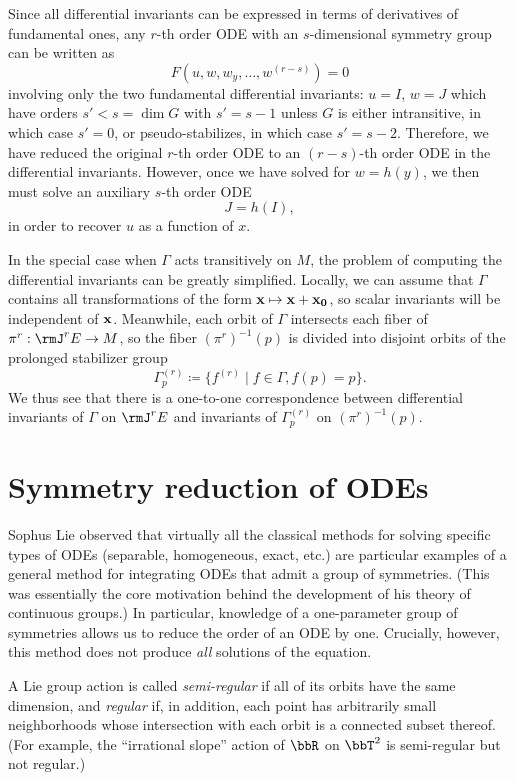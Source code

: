 Since all differential invariants can be expressed in terms of derivatives of fundamental ones, any $r$-th order ODE with an $s$-dimensional symmetry group can be written as 
\[F(u,w,w_y,\ldots,w^{(r-s)})=0\]
involving only the two fundamental differential invariants: $u=I$, $w=J$ which have orders $s'<s=\dim G$  with $s'=s-1$ unless $G$ is either intransitive, in which case $s'=0$, or pseudo-stabilizes, in which case $s'=s-2$. Therefore, we have reduced the original $r$-th order ODE to an $(r-s)$-th order ODE in the differential invariants. However, once we have solved for $w=h(y)$, we then must solve an auxiliary $s$-th order ODE 
\[J=h(I),\]
in order to recover $u$ as a function of $x$. 


\begin{rem}
    In the special case when $\Gamma$ acts transitively on $M$, the problem of computing the differential invariants can be greatly simplified. Locally, we can assume that $\Gamma$ contains all transformations of the form $\bf{x}\mapsto \bf{x}+\bf{x}_0$, so scalar invariants will be independent of $\bf{x}$. Meanwhile, each orbit of $\Gamma$ intersects each fiber of $\pi^r:\rmJ^r E\to M$, so the fiber $(\pi^r)^{-1}(p)$ is divided into disjoint orbits of the prolonged stabilizer group 
    \[\Gamma^{(r)}_p\coloneqq \{f^{(r)}\mid f\in\Gamma,f(p)=p\}.\]
    We thus see that there is a one-to-one correspondence between differential invariants of $\Gamma$ on $\rmJ^r E$ and invariants of $\Gamma^{(r)}_p$ on $(\pi^r)^{-1}(p)$. 
\end{rem}








\section{Symmetry reduction of ODEs}

Sophus Lie observed that virtually all the classical methods for solving specific types of ODEs (separable, homogeneous, exact, etc.) are particular examples of a general method for integrating ODEs that admit a group of symmetries. (This was essentially the core motivation behind the development of his theory of continuous groups.) In particular, knowledge of a one-parameter group of symmetries allows us to reduce the order of an ODE by one. Crucially, however, this method does not produce \emph{all} solutions of the equation.

\begin{rem}
    A Lie group action is called \emph{semi-regular} if all of its orbits have the same dimension, and \emph{regular} if, in addition, each point has arbitrarily small neighborhoods whose intersection with each orbit is a connected subset thereof. (For example, the ``irrational slope'' action of $\bbR$ on $\bbT^2$ is semi-regular but not regular.) 
\end{rem}

